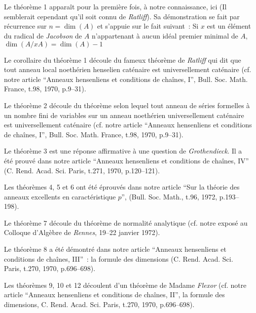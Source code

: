 \section*{}

Le théorème 1 apparaît pour la première fois, à notre connaissance, ici (Il semblerait cependant qu’il soit connu de \emph{Ratliff}). Sa démonstration se fait par récurrence sur $n = \dim(A)$ et s’appuie sur le fait suivant~: Si $x$ est un élément du radical de \emph{Jacobson} de $A$ n’appartenant à aucun idéal premier minimal de $A$, $\dim(A / xA) = \dim(A) - 1$

Le corollaire du théorème 1 découle du fameux théorème de \emph{Ratliff} qui dit que tout anneau local noethérien henselien caténaire est universellement caténaire (cf. notre article ``Anneaux hensenliens et conditions de chaînes, I'', Bull. Soc. Math.  France, t.98, 1970, p.9–31).

Le théorème 2 découle du théorème selon lequel tout anneau de séries formelles à un nombre fini de variables sur un anneau noethérien universellement caténaire est universellement caténaire (cf. notre article ``Anneaux hensenliens et conditions de chaînes, I'', Bull. Soc. Math. France, t.98, 1970, p.9–31).

Le théorème 3 est une réponse affirmative à une question de \emph{Grothendieck}. Il a été prouvé dans notre article ``Anneaux hensenliens et conditions de chaînes, IV'' (C. Rend. Acad. Sci. Paris, t.271, 1970, p.120–121).

Les théorèmes 4, 5 et 6 ont été éprouvés dans notre article ``Sur la théorie des anneaux excellents en caractéristique $p$'', (Bull. Soc. Math., t.96, 1972, p.193–198).

Le théorème 7 découle du théorème de normalité analytique (cf. notre exposé au Colloque d’Algèbre de \emph{Rennes}, 19–22 janvier 1972).

Le théorème 8 a été démontré dans notre article ``Anneaux hensenliens et conditions de chaînes, III''~: la formule des dimensions (C. Rend. Acad. Sci. Paris, t.270, 1970, p.696–698).

Les théorèmes 9, 10 et 12 découlent d’un théorème de Madame \emph{Flexor} (cf. notre article ``Anneaux hensenliens et conditions de chaînes, II'', la formule des dimensions, C. Rend. Acad. Sci. Paris, t.270, 1970, p.696–698).


